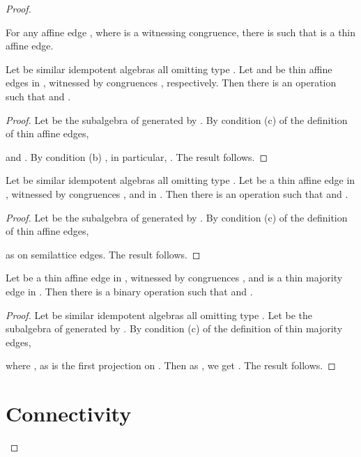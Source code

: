 \documentclass[11pt]{article}
\begin{document}
\begin{proof}
\begin{corollary}\label{cor:thin-affine}
For any affine edge , where  is a witnessing congruence, there is  
such that  is a thin affine edge.
\end{corollary}

\begin{lemma}\label{lem:thin-affine-pair}
Let  be similar idempotent algebras all omitting type \one.
Let  and  be thin affine edges in , witnessed by congruences 
, respectively. Then there is an operation  such that  
and .
\end{lemma}

\begin{proof}
Let  be the subalgebra of  generated by . 
By condition (c) of the definition of thin affine edges,

and . By condition (b) , in particular, 
. The result follows.
\end{proof}

\begin{lemma}\label{lem:affine-sl}
Let  be similar idempotent algebras all omitting type \one.
Let  be a thin affine edge in , witnessed by congruences , and  in . Then there is an operation  such that  and .
\end{lemma}

\begin{proof}
Let  be the subalgebra of  generated by . 
By condition (c) of the definition of thin affine edges,

as  on semilattice edges. The result follows.
\end{proof}

\begin{lemma}\label{lem:affine-maj}
Let  be a thin affine edge in , witnessed by congruences , and  
is a thin majority edge in . Then there is a binary operation  such that 
 and .
\end{lemma}

\begin{proof}
Let  be similar idempotent algebras all omitting type \one.
Let  be the subalgebra of  generated by . 
By condition (c) of the definition of thin majority edges,

where , as  is the first projection on . 
Then as , we get . The result follows.
\end{proof}



\section{Connectivity}\label{sec:connectivity}


\end{proof}
\end{document}
